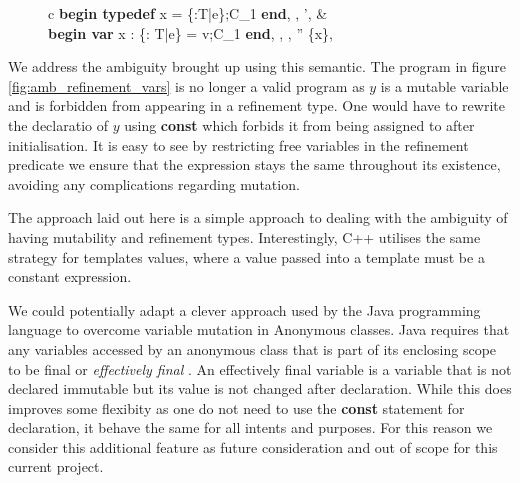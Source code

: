 \documentclass[a4paper,12pt]{report}
\begin{document}
\begin{figure}[H]
  \begin{center}
    \begin{tabular}{c}
      {\langle \textbf{begin typedef } x = \{\upsilon :T\text{ }|\text{ }e\};C_1\textbf{ end}, 
      \sigma, \tau \rangle \longrightarrow 
        \langle \sigma', \tau \rangle}
      & \\
      {\langle\textbf{begin var }x : \{\upsilon : T\text{ }|\text{ }e\} = v;C_1 \textbf{ end}, \sigma, \tau,  \rangle 
      \longrightarrow \langle \sigma'' \setminus \{x\}, \tau \rangle}
    \end{tabular}
  \end{center}
\end{figure}

\par
We address the ambiguity brought up using this semantic. The program in figure 
\ref{fig:amb_refinement_vars} is no longer a valid program as 
$y$ is a mutable variable and is forbidden from appearing in a refinement type. 
One would have to rewrite the declaratio of $y$ using \textbf{const} which 
forbids it from being assigned to after initialisation. 
It is easy to see by restricting free variables in the refinement predicate we ensure 
that the expression stays the same throughout its existence, avoiding any 
complications regarding mutation.

\par
The approach laid out here is a simple approach to dealing with the ambiguity of 
having mutability and refinement types. Interestingly, C++ utilises the same 
strategy for templates values, where a value passed into a template must be a 
constant expression. 

\par
We could potentially adapt a clever approach used by the Java programming 
language to overcome variable mutation in Anonymous classes. Java requires that 
any variables accessed by an anonymous class that is part of 
its enclosing scope to be final or \textit{effectively final} 
\cite{effectFinal}. An effectively final variable is a variable that is not 
declared immutable but its value is not changed after declaration. While this 
does improves some flexibity as one do not need to use the \textbf{const} 
statement for declaration, it behave the same for all intents and purposes. 
For this reason we consider this additional feature as future consideration and 
out of scope for this current project. 
\end{document}
